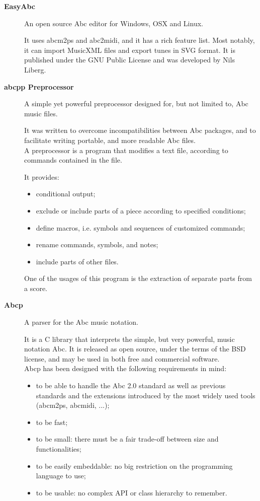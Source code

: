 \documentclass[main.tex]{files}
\begin{document}
\begin{description}
  \item[\textbf{EasyAbc}]\cite{easyabc:Online}
    An open source Abc editor for Windows, OSX and Linux.
    
    It uses abcm2ps and abc2midi, and it has a rich feature list. Most notably, it can import
    MusicXML files and export tunes in SVG format. It is published under the GNU Public License
    and was developed by Nils Liberg.

  \item[\textbf{abcpp Preprocessor}]\cite{abcplus:Online}
    A simple yet powerful preprocessor designed for, but not limited to, Abc music files.
    
    It was written to overcome incompatibilities between Abc packages, and to facilitate writing
    portable, and more readable Abc files.\\ 
    A preprocessor is a program that modifies a text file, according to commands contained in the 
    file.
    
    It provides: 
    \begin{itemize}
      \item conditional output; 
      \item exclude or include parts of a piece according to specified conditions; 
      \item define macros, i.e. symbols and sequences of customized commands;
      \item rename commands, symbols, and notes; 
      \item include parts of other files.
    \end{itemize}
    
    One of the usages of this program is the extraction of separate parts from a score.

  \item[\textbf{Abcp}]\cite{abcp:Online}
    A parser for the Abc music notation.
    
    It is a C library that interprets the simple, but very powerful, music notation Abc. It is
    released as open source, under the terms of the BSD license, and may be used in both free and
    commercial software.\\ 
    Abcp has been designed with the following requirements in mind: 
    \begin{itemize}
      \item to be able to handle the Abc 2.0 standard as well as previous standards and the
      extensions introduced by the most widely used tools (abcm2ps, abcmidi, ...); 
      \item to be fast; 
      \item to be small: there must be a fair trade-off between size and functionalities; 
      \item to be easily embeddable: no big restriction on the programming language to use;
      \item to be usable: no complex API or class hierarchy to remember.
    \end{itemize}


\end{description}
\end{document}
